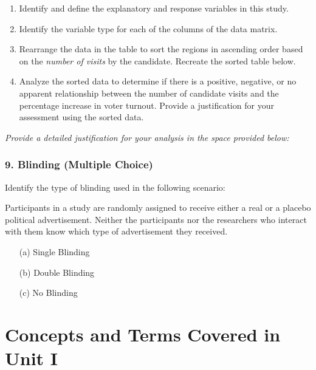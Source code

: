 \documentclass{article}
\begin{document}
\begin{enumerate}
\item Identify and define the explanatory and response variables in this study.
\item Identify the variable type for each of the columns of the data matrix. 
\item Rearrange the data in the table to sort the regions in ascending order based on the \emph{number of visits} by the candidate. Recreate the sorted table below.
\item Analyze the sorted data to determine if there is a positive, negative, or no apparent relationship between the number of candidate visits and the percentage increase in voter turnout. Provide a justification for your assessment using the sorted data.
\end{enumerate}

\par \emph{Provide a detailed justification for your analysis in the space provided below:}
\begin{center}
\end{center}

\subsubsection*{9. Blinding (Multiple Choice)}
Identify the type of blinding used in the following scenario:

Participants in a study are randomly assigned to receive either a real or a placebo political advertisement. Neither the participants nor the researchers who interact with them know which type of advertisement they received.

\begin{itemize}
    \item[(a)] Single Blinding
    \item[(b)] Double Blinding
    \item[(c)] No Blinding
\end{itemize}

\section*{Concepts and Terms Covered in Unit I}
\end{document}
